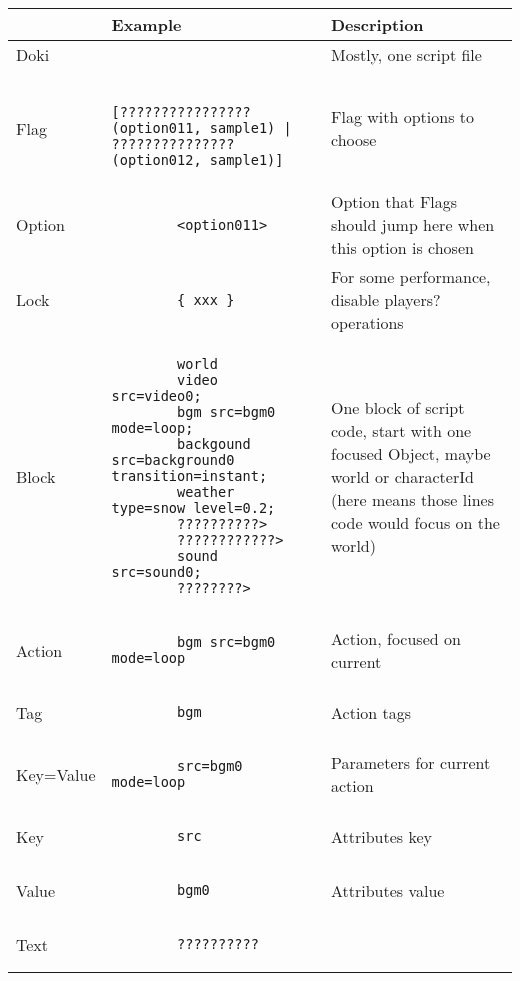 \begin{center}
	\begin{longtable}{| C{1cm} | L{8cm} | L{3cm} |}
		\hline
		& Example & Description \\ \hline
		Doki &
		&
		Mostly, one script file \\ \hline
		Flag & 
		\begin{lstlisting}
		[????????????????(option011, sample1) | ???????????????(option012, sample1)]
		\end{lstlisting} & 
		Flag with options to choose \\ \hline
		Option & 
		\begin{lstlisting}
		<option011>
		\end{lstlisting} &  
		Option that Flags should jump here when this option is chosen \\ \hline
		Lock &
		\begin{lstlisting}
		{ xxx }
		\end{lstlisting} & 
		For some performance, disable players? operations \\ \hline
		Block &
		\begin{lstlisting}
		world
		video src=video0;
		bgm src=bgm0 mode=loop;
		backgound src=background0 transition=instant;
		weather type=snow level=0.2;
		??????????>
		????????????>
		sound src=sound0;
		????????>
		\end{lstlisting} & 
		One block of script code, start with one focused Object, maybe world or characterId (here means those lines code would focus on the world) \\ \hline
		Action &
		\begin{lstlisting}
		bgm src=bgm0 mode=loop
		\end{lstlisting} & 
		Action, focused on current \\ \hline
		Tag &
		\begin{lstlisting}
		bgm
		\end{lstlisting} & 
		Action tags \\ \hline
		Key=Value &
		\begin{lstlisting}
		src=bgm0 mode=loop
		\end{lstlisting} & 
		Parameters for current action \\ \hline
		Key &
		\begin{lstlisting}
		src	
		\end{lstlisting} & 
		Attributes key \\ \hline
		Value &
		\begin{lstlisting}
		bgm0
		\end{lstlisting} & 
		Attributes value\\ \hline
		Text &
		\begin{lstlisting}
		??????????
		\end{lstlisting} & 
		\\ \hline
	\end{longtable}
\end{center}

